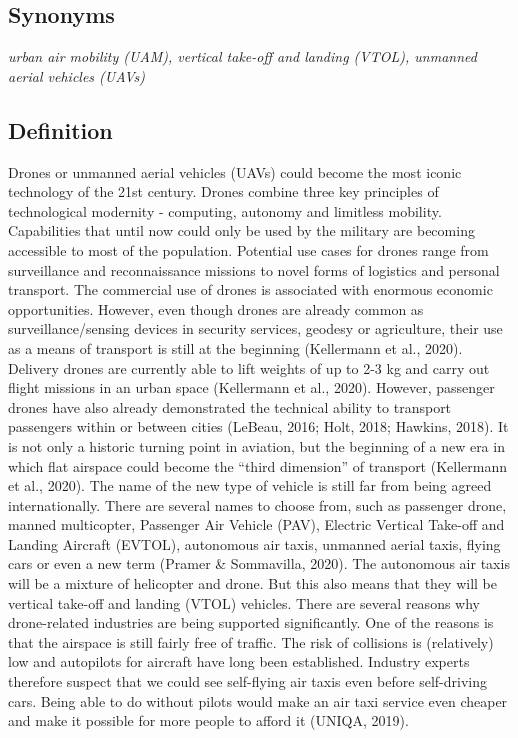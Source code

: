 \documentclass[
]{book}
\begin{document}
\hypertarget{synonyms-36}{%
\subsection*{Synonyms}\label{synonyms-36}}

\emph{urban air mobility (UAM), vertical take-off and landing (VTOL), unmanned aerial vehicles (UAVs)}

\hypertarget{definition-39}{%
\subsection*{Definition}\label{definition-39}}

Drones or unmanned aerial vehicles (UAVs) could become the most iconic technology of the 21st century. Drones combine three key principles of technological modernity - computing, autonomy and limitless mobility. Capabilities that until now could only be used by the military are becoming accessible to most of the population. Potential use cases for drones range from surveillance and reconnaissance missions to novel forms of logistics and personal transport. The commercial use of drones is associated with enormous economic opportunities. However, even though drones are already common as surveillance/sensing devices in security services, geodesy or agriculture, their use as a means of transport is still at the beginning (Kellermann et al., 2020).
Delivery drones are currently able to lift weights of up to 2-3 kg and carry out flight missions in an urban space (Kellermann et al., 2020). However, passenger drones have also already demonstrated the technical ability to transport passengers within or between cities (LeBeau, 2016; Holt, 2018; Hawkins, 2018). It is not only a historic turning point in aviation, but the beginning of a new era in which flat airspace could become the ``third dimension'' of transport (Kellermann et al., 2020).
The name of the new type of vehicle is still far from being agreed internationally. There are several names to choose from, such as passenger drone, manned multicopter, Passenger Air Vehicle (PAV), Electric Vertical Take-off and Landing Aircraft (EVTOL), autonomous air taxis, unmanned aerial taxis, flying cars or even a new term (Pramer \& Sommavilla, 2020).
The autonomous air taxis will be a mixture of helicopter and drone. But this also means that they will be vertical take-off and landing (VTOL) vehicles.
There are several reasons why drone-related industries are being supported significantly. One of the reasons is that the airspace is still fairly free of traffic. The risk of collisions is (relatively) low and autopilots for aircraft have long been established. Industry experts therefore suspect that we could see self-flying air taxis even before self-driving cars. Being able to do without pilots would make an air taxi service even cheaper and make it possible for more people to afford it (UNIQA, 2019).
\end{document}

